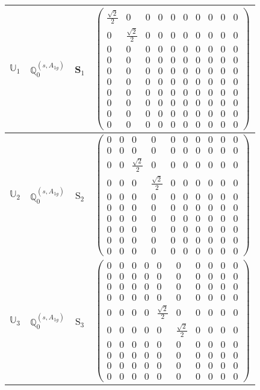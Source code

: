 \documentclass[fleqn,10pt,landscape]{article}
\begin{document}
\begin{itemize}
\begin{center}
\begin{longtable}{c|c|c|c}
$ \mathbb{U}_{1} $ & $\mathbb{Q}_{0}^{(s,A_{1g})}$ & S$_{1}$ & $\begin{pmatrix} \frac{\sqrt{2}}{2} & 0 & 0 & 0 & 0 & 0 & 0 & 0 & 0 & 0 \\ 0 & \frac{\sqrt{2}}{2} & 0 & 0 & 0 & 0 & 0 & 0 & 0 & 0 \\ 0 & 0 & 0 & 0 & 0 & 0 & 0 & 0 & 0 & 0 \\ 0 & 0 & 0 & 0 & 0 & 0 & 0 & 0 & 0 & 0 \\ 0 & 0 & 0 & 0 & 0 & 0 & 0 & 0 & 0 & 0 \\ 0 & 0 & 0 & 0 & 0 & 0 & 0 & 0 & 0 & 0 \\ 0 & 0 & 0 & 0 & 0 & 0 & 0 & 0 & 0 & 0 \\ 0 & 0 & 0 & 0 & 0 & 0 & 0 & 0 & 0 & 0 \\ 0 & 0 & 0 & 0 & 0 & 0 & 0 & 0 & 0 & 0 \\ 0 & 0 & 0 & 0 & 0 & 0 & 0 & 0 & 0 & 0 \end{pmatrix}$ \\ \hline
$ \mathbb{U}_{2} $ & $\mathbb{Q}_{0}^{(s,A_{1g})}$ & S$_{2}$ & $\begin{pmatrix} 0 & 0 & 0 & 0 & 0 & 0 & 0 & 0 & 0 & 0 \\ 0 & 0 & 0 & 0 & 0 & 0 & 0 & 0 & 0 & 0 \\ 0 & 0 & \frac{\sqrt{2}}{2} & 0 & 0 & 0 & 0 & 0 & 0 & 0 \\ 0 & 0 & 0 & \frac{\sqrt{2}}{2} & 0 & 0 & 0 & 0 & 0 & 0 \\ 0 & 0 & 0 & 0 & 0 & 0 & 0 & 0 & 0 & 0 \\ 0 & 0 & 0 & 0 & 0 & 0 & 0 & 0 & 0 & 0 \\ 0 & 0 & 0 & 0 & 0 & 0 & 0 & 0 & 0 & 0 \\ 0 & 0 & 0 & 0 & 0 & 0 & 0 & 0 & 0 & 0 \\ 0 & 0 & 0 & 0 & 0 & 0 & 0 & 0 & 0 & 0 \\ 0 & 0 & 0 & 0 & 0 & 0 & 0 & 0 & 0 & 0 \end{pmatrix}$ \\ \hline
$ \mathbb{U}_{3} $ & $\mathbb{Q}_{0}^{(s,A_{1g})}$ & S$_{3}$ & $\begin{pmatrix} 0 & 0 & 0 & 0 & 0 & 0 & 0 & 0 & 0 & 0 \\ 0 & 0 & 0 & 0 & 0 & 0 & 0 & 0 & 0 & 0 \\ 0 & 0 & 0 & 0 & 0 & 0 & 0 & 0 & 0 & 0 \\ 0 & 0 & 0 & 0 & 0 & 0 & 0 & 0 & 0 & 0 \\ 0 & 0 & 0 & 0 & \frac{\sqrt{2}}{2} & 0 & 0 & 0 & 0 & 0 \\ 0 & 0 & 0 & 0 & 0 & \frac{\sqrt{2}}{2} & 0 & 0 & 0 & 0 \\ 0 & 0 & 0 & 0 & 0 & 0 & 0 & 0 & 0 & 0 \\ 0 & 0 & 0 & 0 & 0 & 0 & 0 & 0 & 0 & 0 \\ 0 & 0 & 0 & 0 & 0 & 0 & 0 & 0 & 0 & 0 \\ 0 & 0 & 0 & 0 & 0 & 0 & 0 & 0 & 0 & 0 \end{pmatrix}$ \\ \hline

\end{longtable}
\end{center}
\end{itemize}
\end{document}
